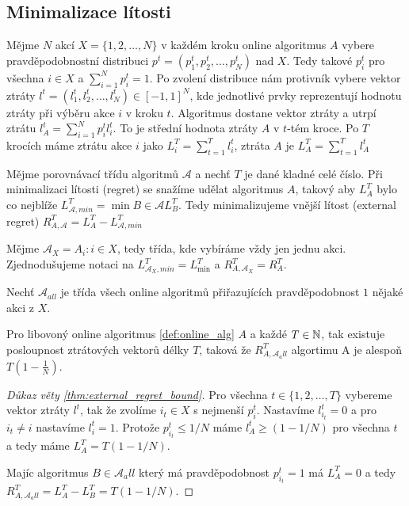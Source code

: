 \subsection{Minimalizace lítosti}
\begin{definition} 
\label{def:online_alg}
Mějme $N$ akcí $X =\{1,2,\dots,N\}$ v každém kroku online algoritmus $A$ vybere pravděpodobnostní distribuci $p^t=(p_1^t, p_2^t, \dots, p_N^t)$ nad $X$. 
Tedy takové $p_i^t$ pro všechna $i \in X$ a $\sum^N_{i=1} p_i^t = 1$. 
Po zvolení distribuce nám protivník vybere vektor ztráty $l^t =(l^t_1, l^t_2, \dots, l^t_N) \in [-1,1]^N$, kde jednotlivé prvky reprezentují hodnotu ztráty při výběru akce $i$ v kroku $t$. 
Algoritmus dostane vektor ztráty a utrpí ztrátu $l^t_A = \sum^N_{i=1} p_i^t l_i^t$. 
To je střední hodnota ztráty $A$ v $t$-tém kroce. 
Po $T$ krocích máme ztrátu akce $i$ jako $L_i^T = \sum^T_{t=1} l_i^t$, ztráta $A$ je $L_A^T = \sum^T_{t=1} l^t_A$
\end{definition}

\begin{definition}
\label{def:external_regret}
Mějme porovnávací třídu algoritmů $\mathcal{A}$ a nechť $T$ je dané kladné celé číslo. 
Při minimalizaci lítosti (regret) se snažíme udělat algoritmus $A$, takový aby $L^T_A$ bylo co nejblíže $L_{\mathcal{A},min}^T = \min{B \in \mathcal{A}} L^T_B$. 
Tedy minimalizujeme vnější lítost (external regret) $R^T_{A,\mathcal{A}} = L^T_A - L^T_{\mathcal{A},min}$

Mějme $\mathcal{A}_X = {A_i: i\in X}$, tedy třída, kde vybíráme vždy jen jednu akci. 
Zjednodušujeme notaci na $L^T_{\mathcal{A}_X,min} = L^T_{\min}$ a $R^T_{A,\mathcal{A}_X} = R^T_A$.

Nechť $\mathcal{A}_{all}$ je třída všech online algoritmů přiřazujících pravděpodobnost $1$ nějaké akci z $X$. 
\end{definition}

\begin{theorem}
\label{thm:external_regret_bound}
Pro libovoný online algoritmus \ref{def:online_alg} $A$ a každé $T \in \mathbb{N}$, tak existuje posloupnost ztrátových vektorů délky $T$, taková že $R^T_{A,\mathcal{A}_all}$ algortimu A je alespoň $T(1 - \frac{1}{N})$. 
\end{theorem}
\begin{proof}[Důkaz věty \ref{thm:external_regret_bound}]
Pro všechna $t\in\{1,2,\dots,T\}$ vybereme vektor ztráty $l^t$, tak že zvolíme $i_t \in X$ s nejmenší $p_i^t$. 
Nastavíme $l^t_{i_t} = 0$ a pro $i_t \neq i$ nastavíme $l_i^t = 1$. 
Protože $p^t_{i_t} \leq 1/N$ máme $l^t_A \geq (1 - 1/N)$ pro všechna $t$ a tedy máme $L_A^T = T(1-1/N)$. 

Majíc algoritmus $B\in \mathcal{A}_all$ který má pravděpodobnost $p_{i_t}^t = 1$ má $L_A^T = 0$ a tedy $R^T_{A,\mathcal{A}_all} = L^T_A - L^T_B = T(1-1/N)$.
\end{proof}

